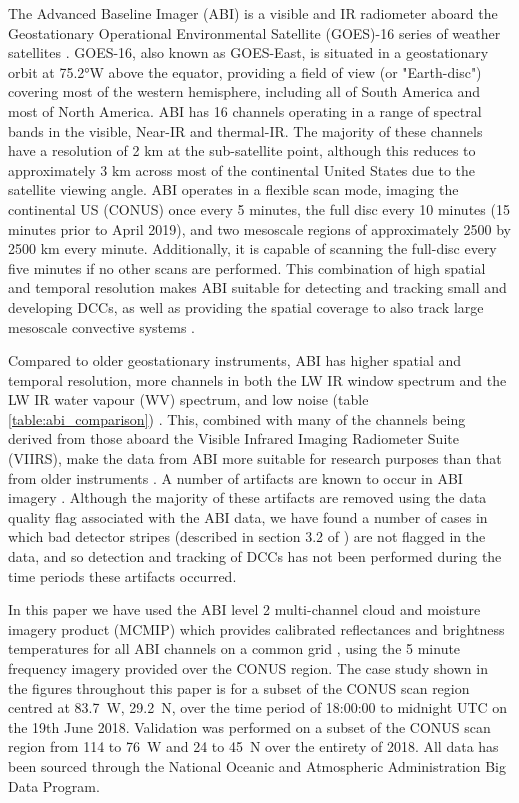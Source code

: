 \documentclass[amt, manuscript]{copernicus}
\begin{document}
The Advanced Baseline Imager (ABI) is a visible and IR radiometer aboard the Geostationary Operational Environmental Satellite (GOES)-16 series of weather satellites \citep{schmit_closer_2016}.
GOES-16, also known as GOES-East, is situated in a geostationary orbit at 75.2°W above the equator, providing a field of view (or "Earth-disc") covering most of the western hemisphere, including all of South America and most of North America.
ABI has 16 channels operating in a range of spectral bands in the visible, Near-IR and thermal-IR.
The majority of these channels have a resolution of 2 \unit{km} at the sub-satellite point, although this reduces to approximately 3 \unit{km} across most of the continental United States due to the satellite viewing angle.
ABI operates in a flexible scan mode, imaging the continental US (CONUS) once every 5 minutes, the full disc every 10 minutes (15 minutes prior to April 2019), and two mesoscale regions of approximately 2500 by 2500 \unit{km} every minute.
Additionally, it is capable of scanning the full-disc every five minutes if no other scans are performed.
This combination of high spatial and temporal resolution makes ABI suitable for detecting and tracking small and developing DCCs, as well as providing the spatial coverage to also track large mesoscale convective systems \citep{heikenfeld_tobac_2019}.

Compared to older geostationary instruments, ABI has higher spatial and temporal resolution, more channels in both the LW IR window spectrum and the LW IR water vapour (WV) spectrum, and low noise (table \ref{table:abi_comparison}) \citep{iacovazzi_goes-16_2020}.
This, combined with many of the channels being derived from those aboard the Visible Infrared Imaging Radiometer Suite (VIIRS), make the data from ABI more suitable for research purposes than that from older instruments \citep{heidinger_chapter_2020}.
A number of artifacts are known to occur in ABI imagery \citep{gunshor_goes-r_2020}.
Although the majority of these artifacts are removed using the data quality flag associated with the ABI data, we have found a number of cases in which bad detector stripes (described in section 3.2 of \citet{gunshor_goes-r_2020}) are not flagged in the data, and so detection and tracking of DCCs has not been performed during the time periods these artifacts occurred.

In this paper we have used the ABI level 2 multi-channel cloud and moisture imagery product (MCMIP) which provides calibrated reflectances and brightness temperatures for all ABI channels on a common grid \citep{schmit_chapter_2020}, using the 5 minute frequency imagery provided over the CONUS region.
The case study shown in the figures throughout this paper is for a subset of the CONUS scan region centred at 83.7\textdegree~W, 29.2\textdegree~N, over the time period of 18:00:00 to midnight UTC on the 19th June 2018.
Validation was performed on a subset of the CONUS scan region from 114 to 76\textdegree~W and 24 to 45\textdegree~N over the entirety of 2018.
All data has been sourced through the National Oceanic and Atmospheric Administration Big Data Program.
\end{document}
